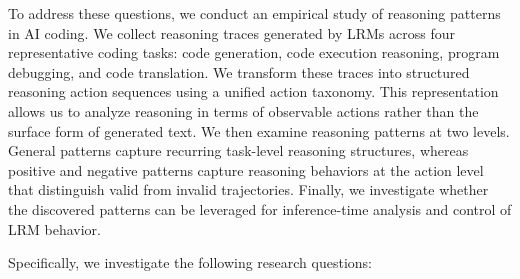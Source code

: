 \documentclass[acmsmall,screen,review,anonymous]{acmart}
\begin{document}
To address these questions, we conduct an empirical study of reasoning patterns in AI coding. We collect reasoning traces generated by LRMs across four representative coding tasks: code generation, code execution reasoning, program debugging, and code translation. We transform these traces into structured reasoning action sequences using a unified action taxonomy. This representation allows us to analyze reasoning in terms of observable actions rather than the surface form of generated text. We then examine reasoning patterns at two levels. General patterns capture recurring task-level reasoning structures, whereas positive and negative patterns capture reasoning behaviors at the action level that distinguish valid from invalid trajectories. Finally, we investigate whether the discovered patterns can be leveraged for inference-time analysis and control of LRM behavior.

Specifically, we investigate the following research questions:
\end{document}
